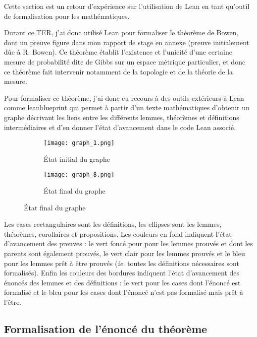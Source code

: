 \documentclass[../../rapport.tex]{subfiles}
\begin{document}
  Cette section est un retour d'expérience sur l'utilisation de Lean en tant qu'outil de formalisation pour les
  mathématiques.

  Durant ce TER, j'ai donc utilisé Lean pour formaliser le théorème de Bowen, dont un preuve figure dans mon rapport de stage
  en annexe (preuve initialement dûe à R. Bowen).
  Ce théorème établit l'existence et l'unicité d'une certaine mesure de probabilité dite de Gibbs sur un espace métrique particulier,
  et donc ce théorème fait intervenir notamment de la topologie et de la théorie de la mesure.

  Pour formaliser ce théorème, j'ai donc eu recours à des outils extérieurs à Lean comme
  leanblueprint \cite{leanblueprint}
  qui permet à partir d'un texte mathématiques d'obtenir un graphe décrivant les liens entre les différents lemmes,
  théorèmes et définitions intermédiaires et d'en donner l'état d'avancement dans le code Lean associé.

  \begin{figure}[h]
    \centering
    \begin{subfigure}{.55\textwidth}
      \centering
      \texttt{[image: graph\_1.png]}
      \caption{État initial du graphe}
    \end{subfigure}
    \begin{subfigure}{.43\textwidth}
      \centering
      \texttt{[image: graph\_8.png]}
      \caption{État final du graphe}
    \end{subfigure}
  \end{figure}

  \begin{spacing}{0.8}
  {\scriptsize
  Les cases rectangulaires sont les définitions, les ellipses sont les lemmes, théorèmes, corollaires et propositions.
  Les couleurs en fond indiquent l'état d'avancement des preuves :
  le vert foncé pour pour les lemmes prouvés et dont les parents sont également prouvés,
  le vert clair pour les lemmes prouvés
  et le bleu pour les lemmes prêt à être prouvés (\textit{ie.} toutes les définitions nécessaires sont formalisés).
  Enfin les couleurs des bordures indiquent l'état d'avancement des énoncés des lemmes et des définitions :
  le vert pour les cases dont l'énoncé est formalisé
  et le bleu pour les cases dont l'énoncé n'est pas formalisé mais prêt à l'être.}
  \end{spacing}

  \subsection{Formalisation de l'énoncé du théorème}
\end{document}
